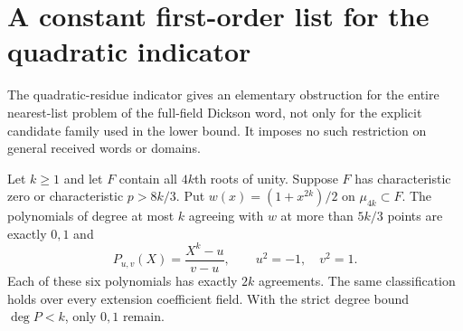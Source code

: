 \section{A constant first-order list for the quadratic indicator}
\label{app:quadratic-indicator}

The quadratic-residue indicator gives an elementary obstruction for
the entire nearest-list problem of the full-field Dickson word, not
only for the explicit candidate family used in the lower bound.
It imposes no such restriction on general received words or domains.

\begin{proposition}\label{prop:quadratic-indicator-rigidity}
Let $k\ge1$ and let $F$ contain all $4k$th roots of unity. Suppose
$F$ has characteristic zero or characteristic $p>8k/3$. Put
$w(x)=(1+x^{2k})/2$ on $\mu_{4k}\subset F$.
The polynomials of degree at most $k$ agreeing with $w$ at more than
$5k/3$ points are exactly $0,1$ and
\[
 P_{u,v}(X)=\frac{X^k-u}{v-u},\qquad u^2=-1,\quad v^2=1.
\]
Each of these six polynomials has exactly $2k$ agreements. The same
classification holds over every extension coefficient field. With the
strict degree bound $\deg P<k$, only $0,1$ remain.
\end{proposition}

